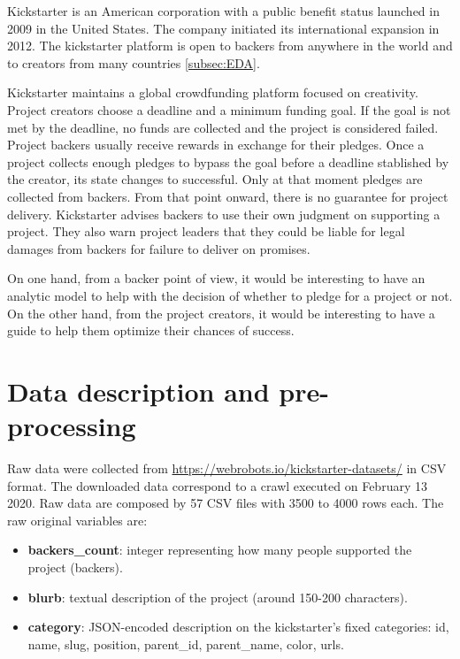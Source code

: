 \documentclass{article}
\begin{document}
{Kickstarter is an American corporation with a public benefit status launched in 2009 in the United States. The company initiated its international expansion in 2012. The kickstarter platform is open to backers from anywhere in the world and to creators from many countries \ref{subsec:EDA}.

Kickstarter maintains a global crowdfunding platform focused on creativity. Project creators choose a deadline and a minimum funding goal. If the goal is not met by the deadline, no funds are collected and the project is considered failed. Project backers usually receive rewards in exchange for their pledges.
Once a project collects enough pledges to bypass the goal before a deadline stablished by the creator, its state changes to successful. Only at that moment pledges are collected from backers. From that point onward, there is no guarantee for project delivery. Kickstarter advises backers to use their own judgment on supporting a project. They also warn project leaders that they could be liable for legal damages from backers for failure to deliver on promises.
 
On one hand, from a backer point of view, it would be interesting to have an analytic model to help with the decision of whether to pledge for a project or not. On the other hand, from the project creators, it would be interesting to have a guide to help them optimize their chances of success.

\section{Data description and pre-processing}
\label{sec:data_desc}

Raw data were collected from \url{https://webrobots.io/kickstarter-datasets/} in CSV format.  The downloaded data correspond to a crawl executed on February 13 2020. Raw data are composed by 57 CSV files with 3500 to 4000 rows each. The raw original variables are:
\begin{itemize}

    \item \textbf{backers\_count}: integer representing how many people supported the project (backers).
    \item \textbf{blurb}: textual description of the project (around 150-200 characters).
    \item \textbf{category}: JSON-encoded description on the kickstarter's fixed categories: id, name, slug, position, parent\_id, parent\_name, color, urls.


\end{itemize}}
\end{document}
